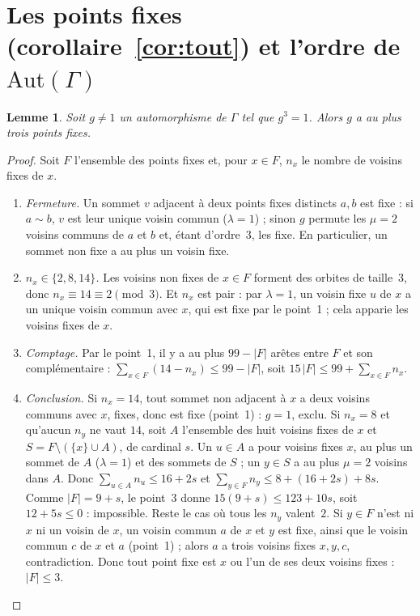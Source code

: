 \documentclass[11pt,a4paper]{article}
\newtheorem{lemma}[theorem]{Lemme}
\theoremstyle{remark}
\begin{document}
\section{Les points fixes (corollaire~\ref{cor:tout}) et l'ordre de $\mathrm{Aut}(\Gamma)$}

\begin{lemma}\label{lem:fix}
Soit $g\ne1$ un automorphisme de $\Gamma$ tel que $g^3=1$. Alors $g$ a au plus trois points fixes.
\end{lemma}
\begin{proof}
Soit $F$ l'ensemble des points fixes et, pour $x\in F$, $n_x$ le nombre de voisins fixes de $x$.
\begin{enumerate}[leftmargin=*,nosep]
\item \emph{Fermeture.} Un sommet $v$ adjacent à deux points fixes distincts $a,b$ est fixe : si $a\sim b$, $v$ est leur unique
voisin commun ($\lambda=1$) ; sinon $g$ permute les $\mu=2$ voisins communs de $a$ et $b$ et, étant d'ordre~3, les fixe. En
particulier, un sommet non fixe a au plus un voisin fixe.
\item \emph{$n_x\in\{2,8,14\}$.} Les voisins non fixes de $x\in F$ forment des orbites de taille~3, donc $n_x\equiv14\equiv2\pmod3$.
Et $n_x$ est pair : par $\lambda=1$, un voisin fixe $u$ de $x$ a un unique voisin commun avec $x$, qui est fixe par le point~1 ;
cela apparie les voisins fixes de $x$.
\item \emph{Comptage.} Par le point~1, il y a au plus $99-|F|$ arêtes entre $F$ et son complémentaire :
$\sum_{x\in F}(14-n_x)\le 99-|F|$, soit $15\,|F|\le 99+\sum_{x\in F}n_x$.
\item \emph{Conclusion.} Si $n_x=14$, tout sommet non adjacent à $x$ a deux voisins communs avec $x$, fixes, donc est fixe
(point~1) : $g=1$, exclu. Si $n_x=8$ et qu'aucun $n_y$ ne vaut $14$, soit $A$ l'ensemble des huit voisins fixes de $x$ et
$S=F\setminus(\{x\}\cup A)$, de cardinal $s$. Un $u\in A$ a pour voisins fixes $x$, au plus un sommet de $A$ ($\lambda=1$) et des
sommets de $S$ ; un $y\in S$ a au plus $\mu=2$ voisins dans $A$. Donc $\sum_{u\in A}n_u\le16+2s$ et
$\sum_{y\in F}n_y\le 8+(16+2s)+8s$. Comme $|F|=9+s$, le point~3 donne $15(9+s)\le 123+10s$, soit $12+5s\le0$ : impossible. Reste
le cas où tous les $n_y$ valent~$2$. Si $y\in F$ n'est ni $x$ ni un voisin de $x$, un voisin commun $a$ de $x$ et $y$ est fixe,
ainsi que le voisin commun $c$ de $x$ et $a$ (point~1) ; alors $a$ a trois voisins fixes $x,y,c$, contradiction. Donc tout point
fixe est $x$ ou l'un de ses deux voisins fixes : $|F|\le3$. \qedhere
\end{enumerate}
\end{proof}
\end{document}
